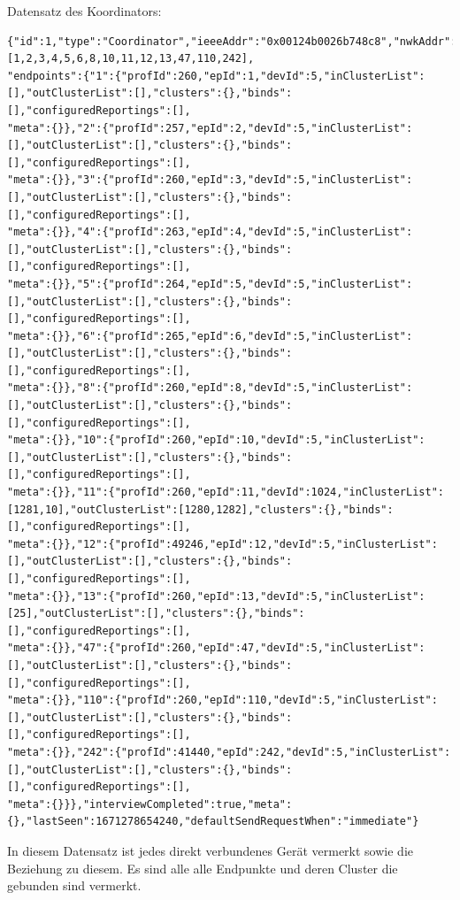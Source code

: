   Datensatz des Koordinators:
  \begin{lstlisting}
{"id":1,"type":"Coordinator","ieeeAddr":"0x00124b0026b748c8","nwkAddr":0,"manufId":0,"epList":[1,2,3,4,5,6,8,10,11,12,13,47,110,242],
"endpoints":{"1":{"profId":260,"epId":1,"devId":5,"inClusterList":[],"outClusterList":[],"clusters":{},"binds":[],"configuredReportings":[],
"meta":{}},"2":{"profId":257,"epId":2,"devId":5,"inClusterList":[],"outClusterList":[],"clusters":{},"binds":[],"configuredReportings":[],
"meta":{}},"3":{"profId":260,"epId":3,"devId":5,"inClusterList":[],"outClusterList":[],"clusters":{},"binds":[],"configuredReportings":[],
"meta":{}},"4":{"profId":263,"epId":4,"devId":5,"inClusterList":[],"outClusterList":[],"clusters":{},"binds":[],"configuredReportings":[],
"meta":{}},"5":{"profId":264,"epId":5,"devId":5,"inClusterList":[],"outClusterList":[],"clusters":{},"binds":[],"configuredReportings":[],
"meta":{}},"6":{"profId":265,"epId":6,"devId":5,"inClusterList":[],"outClusterList":[],"clusters":{},"binds":[],"configuredReportings":[],
"meta":{}},"8":{"profId":260,"epId":8,"devId":5,"inClusterList":[],"outClusterList":[],"clusters":{},"binds":[],"configuredReportings":[],
"meta":{}},"10":{"profId":260,"epId":10,"devId":5,"inClusterList":[],"outClusterList":[],"clusters":{},"binds":[],"configuredReportings":[],
"meta":{}},"11":{"profId":260,"epId":11,"devId":1024,"inClusterList":[1281,10],"outClusterList":[1280,1282],"clusters":{},"binds":[],"configuredReportings":[],
"meta":{}},"12":{"profId":49246,"epId":12,"devId":5,"inClusterList":[],"outClusterList":[],"clusters":{},"binds":[],"configuredReportings":[],
"meta":{}},"13":{"profId":260,"epId":13,"devId":5,"inClusterList":[25],"outClusterList":[],"clusters":{},"binds":[],"configuredReportings":[],
"meta":{}},"47":{"profId":260,"epId":47,"devId":5,"inClusterList":[],"outClusterList":[],"clusters":{},"binds":[],"configuredReportings":[],
"meta":{}},"110":{"profId":260,"epId":110,"devId":5,"inClusterList":[],"outClusterList":[],"clusters":{},"binds":[],"configuredReportings":[],
"meta":{}},"242":{"profId":41440,"epId":242,"devId":5,"inClusterList":[],"outClusterList":[],"clusters":{},"binds":[],"configuredReportings":[],
"meta":{}}},"interviewCompleted":true,"meta":{},"lastSeen":1671278654240,"defaultSendRequestWhen":"immediate"}

  \end{lstlisting}

In diesem Datensatz ist jedes direkt verbundenes Gerät vermerkt sowie die Beziehung zu diesem. Es sind alle alle Endpunkte und deren Cluster die gebunden sind vermerkt. 



